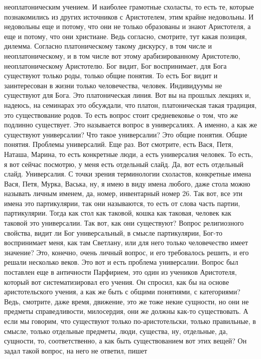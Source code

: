 неоплатоническим учением. И наиболее грамотные схоласты, то есть те, которые
познакомились из других источников с Аристотелем, этим крайне недовольны. И
недовольны еще и потому, что они не только образованы и знают Аристотеля, а еще
и потому, что они христиане. Ведь согласно, смотрите, тут какая позиция,
дилемма. Согласно платоническому такому дискурсу, в том числе и
неоплатоническому, и в том числе вот этому арабизированному Аристотелю,
неоплатоническому Аристотелю. Бог видит, Бог воспринимает, для Бога существуют
только роды, только общие понятия. То есть Бог видит и заинтересован в жизни
только человечества, человек. Индивидуумы не существуют для Бога. Это
платоническая линия. Вот вы на прошлых лекциях и, надеюсь, на семинарах это
обсуждали, что платон, платоническая такая традиция, это существование родов. То
есть вопрос стоит средневековье о том, что же подлинно существует. Это
называется вопрос в универсалиях. А именно, а как же существуют универсалии? Что
такое универсалии? Это общие понятия. Общие понятия. Проблемы универсалий. Еще
раз. Вот смотрите, есть Вася, Петя, Наташа, Марина, то есть конкретные люди, а
есть универсалия человек. То есть, я вот сейчас посмотрю, у меня есть отдельный
слайд. Да, вот есть отдельный слайд. Универсалия. С точки зрения терминологии
схоластов, конкретные имена Вася, Петя, Мурка, Васька, ну, я имею в виду имена
любого, даже стола можно называть личным именем, да, номер, инвентарный номер
26. Так вот, все эти имена это партикулярии, так они называются, то есть от
слова часть партии, партикулярии. Тогда как стол как таковой, кошка как таковая,
человек как таковой это универсалии. Так вот, как они существуют? Вопрос
религиозного свойства, видит ли Бог универсальный, в смысле партикулярии, Бог-то
воспринимает меня, как там Светлану, или для него только человечество имеет
значение? Это, конечно, очень личный вопрос, и его требовалось решить, и его
решали несколько веков. Это вот и есть проблема универсалии. Вопрос был
поставлен еще в античности Парфирием, это один из учеников Аристотеля, который
вот систематизировал его учения. Он спросил, как бы на основе аристотельского
учения, а как же быть с общими понятиями, с категориями? Ведь, смотрите, даже
время, движение, это же тоже некие сущности, но они не предметы справедливости,
милосердия, они же должны как-то существовать. А если мы говорим, что существуют
только по-аристотельски, только правильные, в смысле, только отдельные предметы,
люди, существа, ну, отдельные, да, сущности, то, соответственно, а как быть
существованием вот этих вещей? Он задал такой вопрос, на него не ответил, пишет
